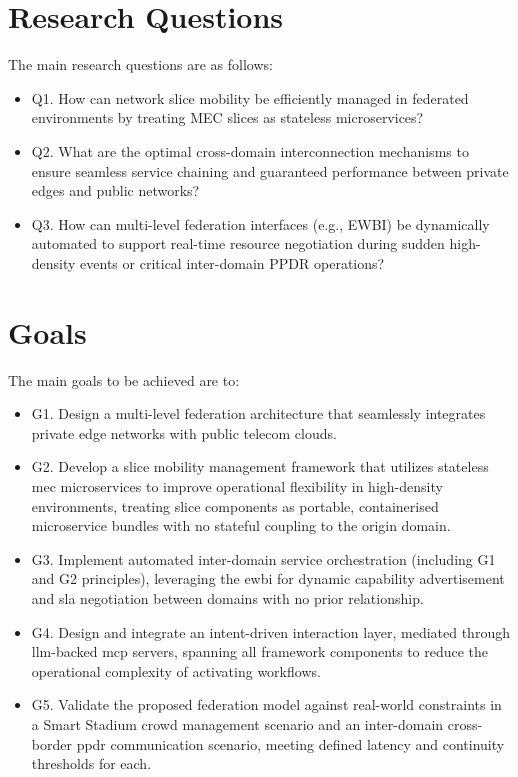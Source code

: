\section{Research Questions}

The main research questions are as follows:

\begin{itemize}
    \item Q1. How can network slice mobility be efficiently managed in federated environments by treating MEC slices as stateless microservices?
    \item Q2. What are the optimal cross-domain interconnection mechanisms to ensure seamless service chaining and guaranteed performance between private edges and public networks?
    \item Q3. How can multi-level federation interfaces (e.g., EWBI) be dynamically automated to support real-time resource negotiation during sudden high-density events or critical inter-domain PPDR operations?
\end{itemize}

\section{Goals}

The main goals to be achieved are to:

\begin{itemize}
    \item G1. Design a multi-level federation architecture that seamlessly integrates private edge networks with public telecom clouds.
    \item G2. Develop a slice mobility management framework that utilizes stateless \ac{mec} microservices to improve operational flexibility in high-density environments, treating slice components as portable, containerised microservice bundles with no stateful coupling to the origin domain.
    \item G3. Implement automated inter-domain service orchestration (including G1 and G2 principles), leveraging the \ac{ewbi} for dynamic capability advertisement and \ac{sla} negotiation between domains with no prior relationship.
    \item G4. Design and integrate an intent-driven interaction layer, mediated through \ac{llm}-backed \ac{mcp} servers, spanning all framework components to reduce the operational complexity of activating workflows.
    \item G5. Validate the proposed federation model against real-world constraints in a Smart Stadium crowd management scenario and an inter-domain cross-border \ac{ppdr} communication scenario, meeting defined latency and continuity thresholds for each.
\end{itemize}


